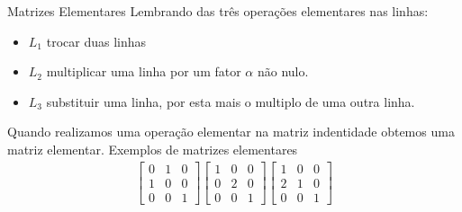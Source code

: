 \documentclass{beamer}
\begin{document}
\begin{frame}{ Matrizes Elementares }
Lembrando das três operações elementares nas linhas:
\begin{itemize}
  \item $L_1$ trocar duas linhas
  \item $L_2$ multiplicar uma linha por um fator $\alpha$ não nulo.
  \item $L_3$ substituir uma linha, por esta mais o multiplo de uma outra linha.
\end{itemize}
Quando realizamos uma operação elementar na matriz indentidade
 obtemos uma matriz elementar.
 Exemplos de matrizes elementares
\begin{gather*}
  \begin{bmatrix}
    0 & 1 & 0 \\
    1 & 0 & 0 \\
    0 & 0 & 1 
  \end{bmatrix} \begin{bmatrix}
    1 & 0 & 0 \\
    0 & 2 & 0 \\
    0 & 0 & 1 
  \end{bmatrix}\begin{bmatrix}
    1 & 0 & 0 \\
    2 & 1 & 0 \\
    0 & 0 & 1 
  \end{bmatrix}
\end{gather*}
\end{frame}
\end{document}
